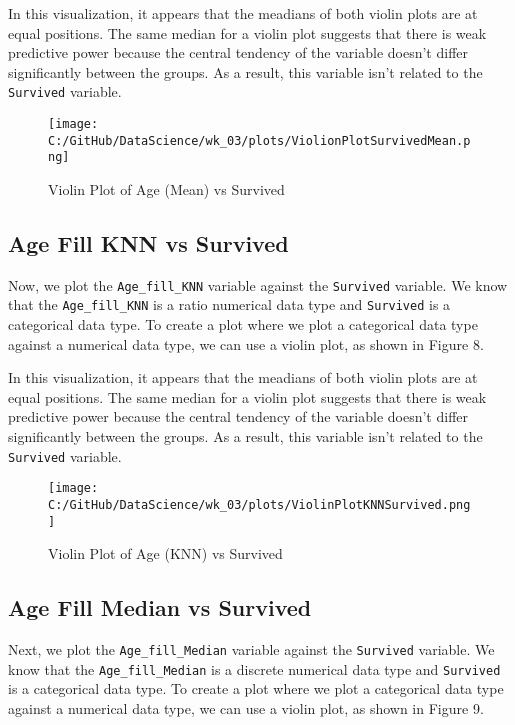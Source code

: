 \documentclass[a4paper, twocolumn]{article}
\begin{document}
In this visualization, it appears that the meadians of both violin plots are at equal positions. The same median 
for a violin plot suggests that there is weak predictive power because the central tendency of the variable doesn't
differ significantly between the groups. As a result, this variable isn't related to the \texttt{Survived} variable.

\begin{figure}[h!] 
    \centering
    \noindent
    \texttt{[image: C:/GitHub/DataScience/wk\_03/plots/ViolionPlotSurvivedMean.png]}  
    \caption{Violin Plot of Age (Mean) vs Survived} 
\end{figure}

\subsection{Age Fill KNN vs Survived}
Now, we plot the \texttt{Age\_fill\_KNN} variable against the \texttt{Survived} variable. We know that the 
\texttt{Age\_fill\_KNN} is a ratio numerical data type and \texttt{Survived} is a categorical data type.
To create a plot where we plot a categorical data type against a numerical data type, we can use a violin plot, as
shown in Figure 8.

In this visualization, it appears that the meadians of both violin plots are at equal positions. The same median
for a violin plot suggests that there is weak predictive power because the central tendency of the variable doesn't
differ significantly between the groups. As a result, this variable isn't related to the \texttt{Survived} variable.

\begin{figure}[h!] 
    \centering
    \noindent
    \texttt{[image: C:/GitHub/DataScience/wk\_03/plots/ViolinPlotKNNSurvived.png]}  
    \caption{Violin Plot of Age (KNN) vs Survived} 
\end{figure}

\subsection{Age Fill Median vs Survived}
Next, we plot the \texttt{Age\_fill\_Median} variable against the \texttt{Survived} variable. We know that the 
\texttt{Age\_fill\_Median} is a discrete numerical data type and \texttt{Survived} is a categorical data type.
To create a plot where we plot a categorical data type against a numerical data type, we can use a violin plot, as
shown in Figure 9.
\end{document}
